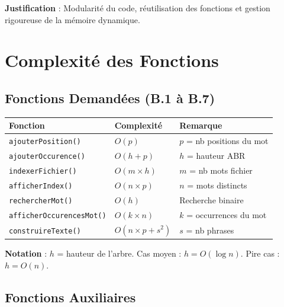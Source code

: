 \documentclass[11pt,a4paper]{article}
\begin{document}
\textbf{Justification} : Modularité du code, réutilisation des fonctions et gestion rigoureuse de la mémoire dynamique.

\section{Complexité des Fonctions}

\subsection{Fonctions Demandées (B.1 à B.7)}

\begin{tabular}{|l|l|l|}
\hline
\textbf{Fonction} & \textbf{Complexité} & \textbf{Remarque} \\
\hline
\texttt{ajouterPosition()} & $O(p)$ & $p$ = nb positions du mot \\
\hline
\texttt{ajouterOccurence()} & $O(h + p)$ & $h$ = hauteur ABR \\
\hline
\texttt{indexerFichier()} & $O(m \times h)$ & $m$ = nb mots fichier \\
\hline
\texttt{afficherIndex()} & $O(n \times p)$ & $n$ = mots distincts \\
\hline
\texttt{rechercherMot()} & $O(h)$ & Recherche binaire \\
\hline
\texttt{afficherOccurencesMot()} & $O(k \times n)$ & $k$ = occurrences du mot \\
\hline
\texttt{construireTexte()} & $O(n \times p + s^2)$ & $s$ = nb phrases \\
\hline
\end{tabular}

\vspace{0.3em}
\textbf{Notation} : $h$ = hauteur de l'arbre. Cas moyen : $h = O(\log n)$. Pire cas : $h = O(n)$.

\subsection{Fonctions Auxiliaires}
\end{document}
